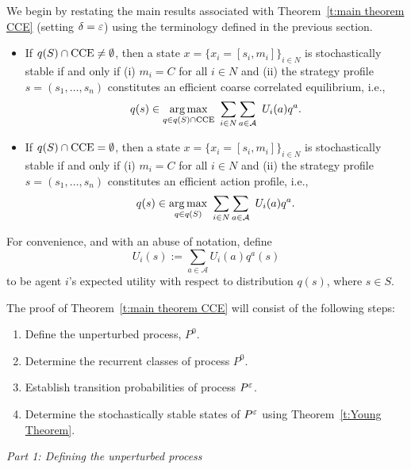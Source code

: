 We begin by restating the main results associated with Theorem~\ref{t:main theorem CCE} (setting $\delta = \varepsilon$) using the terminology defined in the previous section.  
%
\begin{itemize}%
%
\item If $q(S) \cap {\rm CCE} \neq \emptyset$, then a state $x=\{x_i = [s_i, m_i] \}_{i \in N}$ is stochastically stable if and only if (i) $m_i = C$ for all $i \in N$ and (ii) the strategy profile $s = (s_1, \dots, s_n)$ constitutes an efficient coarse correlated equilibrium, i.e., 
%
\begin{equation}\label{e:SS1}
q(s) \in \underset{ q \in q(S) \cap {\rm CCE}}{\arg \max} \ \sum_{i \in N} \sum_{a \in {\cal A}} \ U_i(a) q^a. 
\end{equation}
%
%
\item If $q(S) \cap {\rm CCE} = \emptyset$, then a state $x=\{x_i = [s_i, m_i] \}_{i \in N}$ is stochastically stable if and only if (i) $m_i = C$ for all $i \in N$ and (ii) the strategy profile $s = (s_1, \dots, s_n)$ constitutes an efficient action profile, i.e., 
%
\begin{equation}\label{e:SS2} 
q(s) \in \underset{ q \in q(S)}{\arg \max} \ \sum_{i \in N} \sum_{a \in {\cal A}} \ U_i(a) q^a. 
\end{equation} 
%
\end{itemize}

\noindent For convenience, and with an abuse of notation, define
\begin{equation}
U_i(s) := \sum_{a\in \mathcal{A}}U_i(a)q^a(s)
\end{equation}
to be agent $i$'s expected utility with respect to distribution $q(s)$, where $s\in S.$

The proof of Theorem~\ref{t:main theorem CCE} will consist of the following steps:
%
\begin{enumerate}[label=(\roman*)]
\item Define the unperturbed process, $P^0$.
\item Determine the recurrent classes of process $P^0$.   
\item Establish transition probabilities of process $P^\varepsilon$.
\item Determine the stochastically stable states of $P^\varepsilon$ using Theorem~\ref{t:Young Theorem}.
\end{enumerate}

\vspace{.2cm}
\noindent \emph{Part 1:  Defining the unperturbed process}
\vspace{.2cm}

